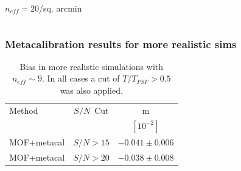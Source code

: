 \documentclass{beamer}
\newcommand{\snr}{$S/N$}
\begin{document}
\begin{frame}
\begin{columns}
\begin{column}{0.5\textwidth}
\begin{center}
                \newline
                $n_{eff}=$20/sq. arcmin
            \end{center}
        \end{column}
    \end{columns}
\end{frame}

\begin{frame}
    \frametitle{Metacalibration results for more realistic sims}

 
    \begin{table}
        \centering
        \begin{tabular}{|l|c|c|}
            \hline
            Method         & \snr\ Cut & m             \\
                           &           & $[10^{-2}]$   \\
            \hline

            \hline
            MOF+metacal    & \snr$ > 15$ & $-0.041 \pm 0.006$  \\
            MOF+metacal    & \snr$ > 20$ & $-0.038 \pm 0.008$  \\

            \hline
        \end{tabular}
        \caption{Bias in more realistic simulations with $n_{eff} \sim 9$.  In all cases a cut
            of $T/T_{PSF} > 0.5$ was also applied.
        \label{tab:mcal:deblending}}
    \end{table}


\end{frame}



 


\end{document}
